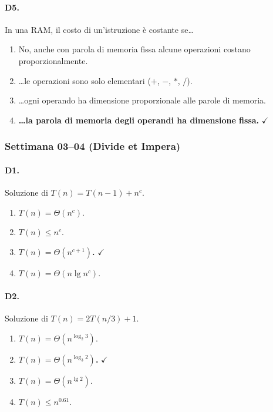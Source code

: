 \paragraph{D5.} In una RAM, il costo di un'istruzione \`e costante se\ldots
\begin{enumerate}[label=\Alph*.,leftmargin=*]
	\item No, anche con parola di memoria fissa alcune operazioni costano proporzionalmente.
	\item \ldots le operazioni sono solo elementari ($+$, $-$, $*$, $/$).
	\item \ldots ogni operando ha dimensione proporzionale alle parole di memoria.
	\item \textcolor{correctgreen}{\textbf{\ldots la parola di memoria degli operandi ha dimensione fissa.}} \hfill\textcolor{correctgreen}{$\checkmark$}
\end{enumerate}

\subsubsection{Settimana 03--04 (Divide et Impera)}

\paragraph{D1.} Soluzione di $T(n) = T(n-1) + n^c$.
\begin{enumerate}[label=\Alph*.,leftmargin=*]
	\item $T(n) = \Theta(n^c)$.
	\item $T(n) \leq n^c$.
	\item \textcolor{correctgreen}{\textbf{$T(n) = \Theta(n^{c+1})$.}} \hfill\textcolor{correctgreen}{$\checkmark$}
	\item $T(n) = \Theta(n \lg n^c)$.
\end{enumerate}

\paragraph{D2.} Soluzione di $T(n) = 2T(n/3) + 1$.
\begin{enumerate}[label=\Alph*.,leftmargin=*]
	\item $T(n) = \Theta(n^{\log_2 3})$.
	\item \textcolor{correctgreen}{\textbf{$T(n) = \Theta(n^{\log_3 2})$.}} \hfill\textcolor{correctgreen}{$\checkmark$}
	\item $T(n) = \Theta(n^{\lg 2})$.
	\item $T(n) \leq n^{0.61}$.
\end{enumerate}

